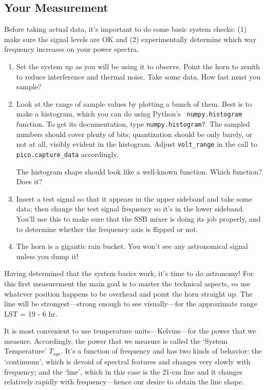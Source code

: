 \documentclass[12pt,preprint]{aastex}
\begin{document}
\subsection{Your Measurement}

Before taking actual data, it's important to do some basic system
checks: (1) make sure the signal levels are OK and (2) experimentally
determine which way frequency increases on your power spectra.
\begin{enumerate}

\item Set the system up as you will be using it to observe. Point the
  horn to zenith to reduce interference and thermal noise.  Take some
data.  How fast must you sample? 

\item Look at the range of sample values by plotting a bunch of
  them. Best is to make a histogram, which you can do using Python's {\tt
    numpy.histogram} function.  
      To get its documentation,
    type {\tt numpy.histogram?}.
    The sampled numbers should cover plenty of bits;
  quantization should be only barely, or not at all, visibly evident in
  the histogram. Adjust {\tt volt\_range} in the call to {\tt pico.capture\_data}
  accordingly.

The
  histogram shape should look like a well-known function. Which
  function? Does it?

\item Insert a test signal so that it appears in the upper sideband and
take some data; then change the test signal frequency so it's in the
lower sideband.  You'll use this to make sure that the SSB mixer is
doing its job properly, and to determine whether the frequency axis
is flipped or not.

\item The horn is a gigantic rain bucket. You won't see any
  astronomical signal unless you dump it!

\end{enumerate}

Having determined that the system basics work, it's time to do
astronomy! For this first measurement the main goal is to master the
technical aspects, so use whatever position happens to be overhead and
point the horn straight up. The line will be strongest---strong enough
to see visually---for the approximate range LST = 19 - 6 hr.

It is most convenient to use temperature units---Kelvins---for the power
that we measure. Accordingly, the power that we measure is called the
`System Temperature' $T_{sys}$. It's a function of frequency and has two
kinds of behavior: the `continuum', which is devoid of spectral features
and changes very slowly with frequency; and the `line', which in this
case is the 21-cm line and it changes relatively rapidly with frequency---hence our
desire to obtain the line shape.
\end{document}
